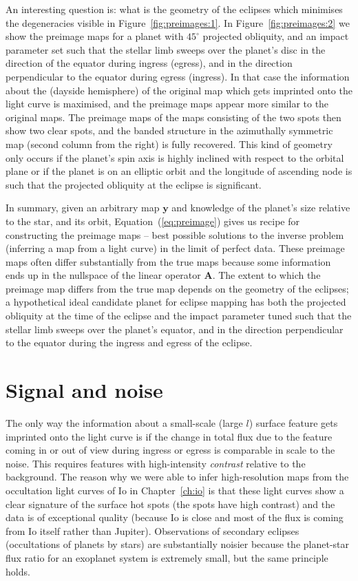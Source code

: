 \documentclass[12pt,dvipsnames]{report}
\begin{document}
An interesting question is: what is the geometry of the eclipses which minimises
the degeneracies visible in Figure~\ref{fig:preimages:1}. In
Figure~\ref{fig:preimages:2} we show the preimage maps for a planet with
$45^\circ$ projected obliquity, and an impact parameter set such that the
stellar limb sweeps over the planet's disc in the direction of the equator
during ingress (egress), and in the direction perpendicular to the equator
during egress (ingress). In that case the information about the (dayside
hemisphere) of the original map which gets imprinted onto the light curve is
maximised, and the preimage maps appear more similar to the original maps. The
preimage maps of the maps consisting of the two spots then show two clear spots, and
the banded structure in the azimuthally symmetric map (second column from the
right) is fully recovered. This kind of geometry only occurs if the planet's
spin axis is highly inclined with respect to the orbital plane or if the planet
is on an elliptic orbit and the longitude of ascending node is such that the
projected obliquity at the eclipse is significant. 

In summary, given an arbitrary map $\mathbf{y}$ and knowledge of the planet's
size relative to the star, and its orbit, Equation~(\ref{eq:preimage}) gives us
recipe for constructing the preimage maps -- best possible solutions to the
inverse problem (inferring a map from a light curve) in the limit of perfect
data. These preimage maps often differ substantially  from the true maps because
some information ends up in the nullspace of the linear operator $\mathbf{A}$.
The extent to which the preimage map differs from the true map depends on the
geometry of the eclipses; a hypothetical ideal candidate planet for eclipse
mapping has both the projected obliquity at the time of the eclipse and the impact
parameter tuned such that the stellar limb sweeps over the planet's equator, and
in the direction perpendicular to the equator during the ingress and egress of
the eclipse.

\section{Signal and noise}
\label{sec:exo_signal_noise}
The only way the information about a small-scale (large $l$) surface feature gets 
imprinted onto the light curve is if the change in total flux due to the feature coming 
in or out of view during ingress or egress is comparable in scale to the noise.
This requires features with high-intensity \emph{contrast} relative to the background.
The reason why we were able to infer high-resolution maps  from the occultation light 
curves of Io in Chapter~\ref{ch:io} is that these light curves show a clear 
signature of the surface hot spots (the spots have high contrast) and the data is of 
exceptional quality (because Io is close and most of the flux is coming from Io itself 
rather than Jupiter).
Observations of secondary eclipses (occultations of planets by stars) are substantially
noisier because the planet-star flux ratio for an exoplanet system is extremely small,
but the same principle holds.
\end{document}
